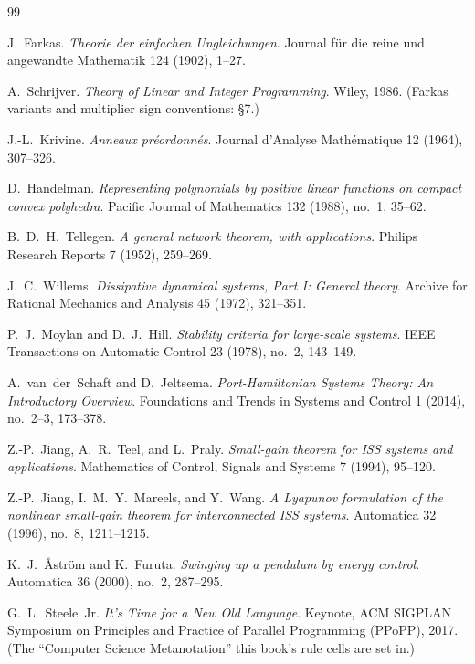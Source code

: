 \clearpage
\begin{thebibliography}{99}
\footnotesize

J.~Farkas.
\emph{Theorie der einfachen Ungleichungen}.
Journal f\"ur die reine und angewandte Mathematik 124 (1902), 1--27.

A.~Schrijver.
\emph{Theory of Linear and Integer Programming}.
Wiley, 1986. (Farkas variants and multiplier sign conventions: \S7.)

J.-L.~Krivine.
\emph{Anneaux pr\'eordonn\'es}.
Journal d'Analyse Math\'ematique 12 (1964), 307--326.

D.~Handelman.
\emph{Representing polynomials by positive linear functions on compact
convex polyhedra}.
Pacific Journal of Mathematics 132 (1988), no.~1, 35--62.

B.~D.~H.~Tellegen.
\emph{A general network theorem, with applications}.
Philips Research Reports 7 (1952), 259--269.

J.~C.~Willems.
\emph{Dissipative dynamical systems, Part I: General theory}.
Archive for Rational Mechanics and Analysis 45 (1972), 321--351.

P.~J.~Moylan and D.~J.~Hill.
\emph{Stability criteria for large-scale systems}.
IEEE Transactions on Automatic Control 23 (1978), no.~2, 143--149.

A.~van~der~Schaft and D.~Jeltsema.
\emph{Port-Hamiltonian Systems Theory: An Introductory Overview}.
Foundations and Trends in Systems and Control 1 (2014), no.~2--3, 173--378.

Z.-P.~Jiang, A.~R.~Teel, and L.~Praly.
\emph{Small-gain theorem for ISS systems and applications}.
Mathematics of Control, Signals and Systems 7 (1994), 95--120.

Z.-P.~Jiang, I.~M.~Y.~Mareels, and Y.~Wang.
\emph{A Lyapunov formulation of the nonlinear small-gain theorem for
interconnected ISS systems}.
Automatica 32 (1996), no.~8, 1211--1215.

K.~J.~{\AA}str\"om and K.~Furuta.
\emph{Swinging up a pendulum by energy control}.
Automatica 36 (2000), no.~2, 287--295.

G.~L.~Steele~Jr.
\emph{It's Time for a New Old Language}.
Keynote, ACM SIGPLAN Symposium on Principles and Practice of Parallel
Programming (PPoPP), 2017. (The ``Computer Science Metanotation'' this
book's rule cells are set in.)

\end{thebibliography}
